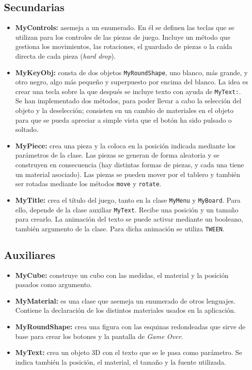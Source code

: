 \documentclass[11pt,a4paper]{article}
\begin{document}
    \subsection{Secundarias}
        \begin{itemize}
            \item \textbf{MyControls:} asemeja a un enumerado. En él se definen las teclas que se utilizan para los controles de las piezas de juego. Incluye un método que gestiona los movimientos, las rotaciones, el guardado de piezas o la caída directa de cada pieza (\textit{hard drop}).
            \item \textbf{MyKeyObj:} consta de dos objetos \texttt{MyRoundShape}, uno blanco, más grande, y otro negro, algo más pequeño y superpuesto por encima del blanco. La idea es crear una tecla sobre la que después se incluye texto con ayuda de \texttt{MyText:}. Se han implementado dos métodos, para poder llevar a cabo la selección del objeto y la deselección; consisten en un cambio de materiales en el objeto para que se pueda apreciar a simple vista que el botón ha sido pulsado o soltado.
            \item \textbf{MyPiece:} crea una pieza y la coloca en la posición indicada mediante los parámetros de la clase. Las piezas se generan de forma aleatoria y se construyen en consecuencia (hay distintas formas de piezas, y cada una tiene un material asociado). Las piezas se pueden mover por el tablero y también ser rotadas mediante los métodos \texttt{move} y \texttt{rotate}.
            \item \textbf{MyTitle:} crea el título del juego, tanto en la clase \texttt{MyMenu} y \texttt{MyBoard}. Para ello, depende de la clase auxiliar \texttt{MyText}. Recibe una posición y un tamaño para crearlo. La animación del texto se puede activar mediante un booleano, también argumento de la clase. Para dicha animación se utiliza \texttt{TWEEN}.
        \end{itemize} 
    
    \subsection{Auxiliares}
        \begin{itemize}
            \item \textbf{MyCube:} construye un cubo con las medidas, el material y la posición pasados como argumento.
            \item \textbf{MyMaterial:} es una clase que asemeja un enumerado de otros lenguajes. Contiene la declaración de los distintos materiales usados en la aplicación.
            \item \textbf{MyRoundShape:} crea una figura con las esquinas redondeadas que sirve de base para crear los botones y la pantalla de \textit{Game Over}.
            \item \textbf{MyText:} crea un objeto 3D con el texto que se le pasa como parámetro. Se indica también la posición, el material, el tamaño y la fuente utilizada.
        \end{itemize}
        
\end{document}
